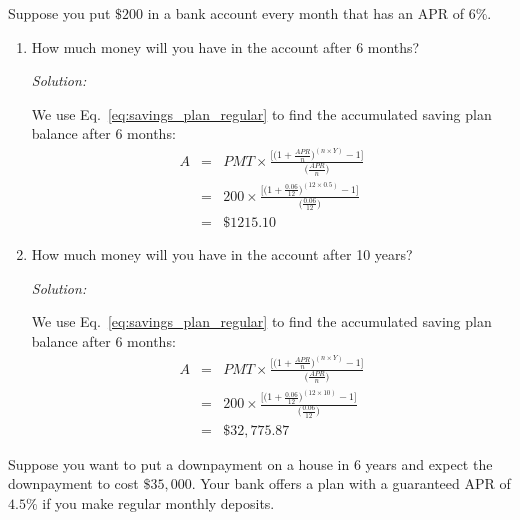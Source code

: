 \documentclass[12pt]{article}
\begin{document}
Suppose you put $\$200$ in a bank account every month that has an APR of $6\%$.

\begin{enumerate}
\item How much money will you have in the account after 6 months?

{\it Solution:

We use Eq.~\eqref{eq:savings_plan_regular} to find the accumulated saving plan balance after 6 months:
\begin{eqnarray*}
	A &=& PMT \times \frac{\Big[\Big(1 + \frac{APR}{n}\Big)^{(n\times Y)} - 1\Big]}{\Big(\frac{APR}{n}\Big)} \\
	&=& 200 \times \frac{\Big[\Big(1 + \frac{0.06}{12}\Big)^{(12\times 0.5)} - 1\Big]}{\Big(\frac{0.06}{12}\Big)} \\
	&=& \$1215.10
\end{eqnarray*}
}
\item How much money will you have in the account after 10 years?

{\it Solution:

We use Eq.~\eqref{eq:savings_plan_regular} to find the accumulated saving plan balance after 6 months:
\begin{eqnarray*}
	A &=& PMT \times \frac{\Big[\Big(1 + \frac{APR}{n}\Big)^{(n\times Y)} - 1\Big]}{\Big(\frac{APR}{n}\Big)} \\
	&=& 200 \times \frac{\Big[\Big(1 + \frac{0.06}{12}\Big)^{(12\times 10)} - 1\Big]}{\Big(\frac{0.06}{12}\Big)} \\
	&=& \$32,775.87
\end{eqnarray*}
}

\end{enumerate}

Suppose you want to put a downpayment on a house in 6 years and expect the downpayment to cost $\$35,000$.  Your bank offers a plan with a guaranteed APR of $4.5\%$ if you make regular monthly deposits.
\end{document}
